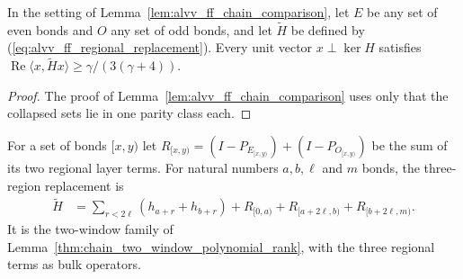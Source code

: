 \begin{lemma}
    \label{lem:alvv_ff_family_parity_gap}
    \leanok
    In the setting of Lemma~\ref{lem:alvv_ff_chain_comparison}, let $E$ be any
    set of even bonds and $O$ any set of odd bonds, and let $\widetilde H$ be
    defined by (\ref{eq:alvv_ff_regional_replacement}). Every unit vector
    $x\perp\ker H$ satisfies
    $\operatorname{Re}\langle x,\widetilde Hx\rangle\ge\gamma/(3(\gamma+4))$.
\end{lemma}
\begin{proof}\leanok
    The proof of Lemma~\ref{lem:alvv_ff_chain_comparison} uses only that the
    collapsed sets lie in one parity class each.
\end{proof}

\begin{definition}
    \label{def:alvv_ff_family_three_region}
    \leanok
    For a set of bonds $[x,y)$ let $R_{[x,y)}=(I-P_{E_{[x,y)}})+(I-P_{O_{[x,y)}})$
    be the sum of its two regional layer terms. For natural numbers $a,b,\ell$
    and $m$ bonds, the three-region replacement is
    \begin{align}
        \widetilde H & =\sum_{r<2\ell}(h_{a+r}+h_{b+r})
        +R_{[0,a)}+R_{[a+2\ell,b)}+R_{[b+2\ell,m)}.
        \label{eq:alvv_ff_family_three_region}
    \end{align}
    It is the two-window family of
    Lemma~\ref{thm:chain_two_window_polynomial_rank}, with the three regional
    terms as bulk operators.
\end{definition}

